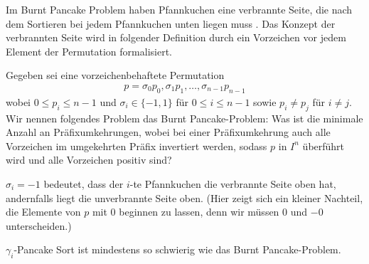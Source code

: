 \documentclass[a4paper, 10pt, ngerman]{article}
\begin{document}
Im Burnt Pancake Problem haben Pfannkuchen eine verbrannte Seite, die nach dem Sortieren bei jedem Pfannkuchen unten liegen muss \cite{burntpancakes}. Das Konzept der verbrannten Seite wird in folgender Definition durch ein Vorzeichen vor jedem Element der Permutation formalisiert.
\begin{definition}
    Gegeben sei eine vorzeichenbehaftete Permutation
    \begin{align*}
        p = \sigma_0 p_0, \sigma_1 p_1, \dots, \sigma_{n-1} p_{n-1}
    \end{align*}
    wobei $0 \le p_i \le n-1$ und $\sigma_i \in \{-1, 1\}$ für $0 \le i \le n - 1$ sowie $p_i \ne p_j$ für $i \ne j$. Wir nennen folgendes Problem das Burnt Pancake-Problem: Was ist die minimale Anzahl an Präfixumkehrungen, wobei bei einer Präfixumkehrung auch alle Vorzeichen im umgekehrten Präfix invertiert werden, sodass $p$ in $I^n$ überführt wird und alle Vorzeichen positiv sind?
\end{definition}
$\sigma_i = -1$ bedeutet, dass der $i$-te Pfannkuchen die verbrannte Seite oben hat, andernfalls liegt die unverbrannte Seite oben. (Hier zeigt sich ein kleiner Nachteil, die Elemente von $p$ mit 0 beginnen zu lassen, denn wir müssen 0 und $-0$ unterscheiden.)

\begin{theorem}
    $\gamma_i$-Pancake Sort ist mindestens so schwierig wie das Burnt Pancake-Problem.
\end{theorem}
\end{document}
